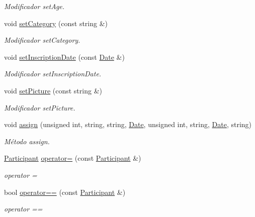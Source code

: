 \begin{DoxyCompactItemize}
\begin{DoxyCompactList}\small\item\em Modificador set\+Age. \end{DoxyCompactList}\item 
void \hyperlink{class_participant_a42bf4d1082274e44657829fc2aa83f11}{set\+Category} (const string \&)\hypertarget{class_participant_a42bf4d1082274e44657829fc2aa83f11}{}\label{class_participant_a42bf4d1082274e44657829fc2aa83f11}

\begin{DoxyCompactList}\small\item\em Modificador set\+Category. \end{DoxyCompactList}\item 
void \hyperlink{class_participant_a1ae8d99347f3690e3e7f50392a0674b2}{set\+Inscription\+Date} (const \hyperlink{class_date}{Date} \&)\hypertarget{class_participant_a1ae8d99347f3690e3e7f50392a0674b2}{}\label{class_participant_a1ae8d99347f3690e3e7f50392a0674b2}

\begin{DoxyCompactList}\small\item\em Modificador set\+Inscription\+Date. \end{DoxyCompactList}\item 
void \hyperlink{class_participant_a99a298d23801e7080efd59c514711b22}{set\+Picture} (const string \&)\hypertarget{class_participant_a99a298d23801e7080efd59c514711b22}{}\label{class_participant_a99a298d23801e7080efd59c514711b22}

\begin{DoxyCompactList}\small\item\em Modificador set\+Picture. \end{DoxyCompactList}\item 
void \hyperlink{class_participant_aacee4e07ebfe68b4521217b2c3b6dbf5}{assign} (unsigned int, string, string, \hyperlink{class_date}{Date}, unsigned int, string, \hyperlink{class_date}{Date}, string)\hypertarget{class_participant_aacee4e07ebfe68b4521217b2c3b6dbf5}{}\label{class_participant_aacee4e07ebfe68b4521217b2c3b6dbf5}

\begin{DoxyCompactList}\small\item\em Método assign. \end{DoxyCompactList}\item 
\hyperlink{class_participant}{Participant} \hyperlink{class_participant_af7f2abaadf20275a00ef287ec81ca546}{operator=} (const \hyperlink{class_participant}{Participant} \&)
\begin{DoxyCompactList}\small\item\em operator = \end{DoxyCompactList}\item 
bool \hyperlink{class_participant_a9cd554a2a6a8cdd2216167ed90c9bc93}{operator==} (const \hyperlink{class_participant}{Participant} \&)
\begin{DoxyCompactList}\small\item\em operator == \end{DoxyCompactList}\end{DoxyCompactItemize}


